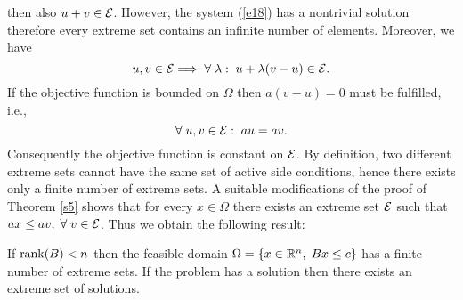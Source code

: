 %
then also $u + v \in {\cal E}$.  However, the system (\ref{e18}) has a nontrivial
solution therefore every extreme set contains an infinite number of elements.
Moreover, we have
\[
u, v \in {\cal E} \Longrightarrow \; \forall \; \lambda: \; u + \lambda (v - u) \in
{\cal E} .
\]
If the objective function is bounded on $\Omega$ then $ a(v - u) = 0 $ must be
fulfilled, i.e.,
\[
\forall \; u, v \in {\cal E}: \; au = av.
\]
Consequently the objective function is constant on ${\cal E}$.  By definition, two
different extreme sets cannot have the same set of active side conditions,
hence there exists only a finite number of extreme sets.  A suitable
modifications of the proof of Theorem \ref{s5} shows that for every $x \in
\Omega$ there exists an extreme set ${\cal E}$ such that $ax \leq av, \; \forall \; v
\in {\cal E}$.  Thus we obtain the following result:
%
\begin{theorem} \label{s6}
If $\mathop{\rm rank}\nolimits (B) < n$ then the feasible domain $\Omega = \{x \in \Bbb{R}^n, \; Bx
\leq c\}$ has a finite number of extreme sets.  If the problem has a solution
then there exists an extreme set of solutions.
\end{theorem}
%
